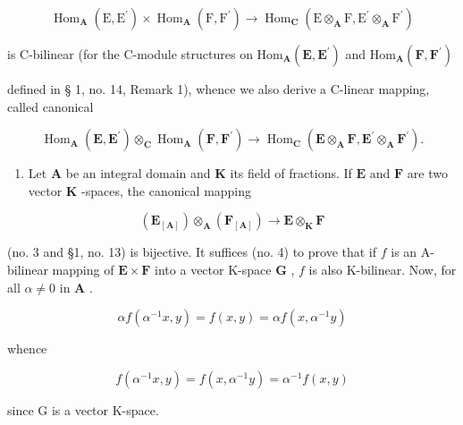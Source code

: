 \[
\operatorname{Hom} _ {\mathbf {A}} (\mathrm{E}, \mathrm{E} ^ {\prime}) \times \operatorname{Hom} _ {\mathbf {A}} (\mathrm{F}, \mathrm{F} ^ {\prime}) \rightarrow \operatorname{Hom} _ {\mathbf {C}} (\mathrm{E} \otimes_ {\mathbf {A}} \mathrm{F}, \mathrm{E} ^ {\prime} \otimes_ {\mathbf {A}} \mathrm{F} ^ {\prime})
\]

is C-bilinear (for the C-module structures on \(\mathrm{Hom}_{\mathbf{A}}(\mathbf{E},\mathbf{E}^{\prime})\) and \(\mathrm{Hom}_{\mathbf{A}}(\mathbf{F},\mathbf{F}^{\prime})\)

defined in § 1, no. 14, Remark 1), whence we also derive a C-linear mapping, called canonical

\[
\operatorname{Hom} _ {\mathbf {A}} (\mathbf {E}, \mathbf {E} ^ {\prime}) \otimes_ {\mathbf {C}} \operatorname{Hom} _ {\mathbf {A}} (\mathbf {F}, \mathbf {F} ^ {\prime}) \rightarrow \operatorname{Hom} _ {\mathbf {C}} (\mathbf {E} \otimes_ {\mathbf {A}} \mathbf {F}, \mathbf {E} ^ {\prime} \otimes_ {\mathbf {A}} \mathbf {F} ^ {\prime}).\tag{13}
\]

\begin{enumerate}
\def\labelenumi{(\arabic{enumi})}
\setcounter{enumi}{2}
\tightlist
\item
  Let \(\mathbf{A}\) be an integral domain and \(\mathbf{K}\) its field of fractions. If \(\mathbf{E}\) and \(\mathbf{F}\) are two vector \(\mathbf{K}\) -spaces, the canonical mapping
\end{enumerate}

\[
\left(\mathbf {E} _ {[ \mathbf {A} ]}\right) \otimes_ {\mathbf {A}} \left(\mathbf {F} _ {[ \mathbf {A} ]}\right)\rightarrow \mathbf {E} \otimes_ {\mathbf {K}} \mathbf {F}
\]

(no. 3 and §1, no. 13) is bijective. It suffices (no. 4) to prove that if \(f\) is an A-bilinear mapping of \(\mathbf{E} \times \mathbf{F}\) into a vector K-space \(\mathbf{G}\) , \(f\) is also K-bilinear. Now, for all \(\alpha \neq 0\) in \(\mathbf{A}\) .

\[
\alpha f (\alpha^ {- 1} x, y) = f (x, y) = \alpha f (x, \alpha^ {- 1} y)
\]

whence

\[
f (\alpha^ {- 1} x, y) = f (x, \alpha^ {- 1} y) = \alpha^ {- 1} f (x, y)
\]

since G is a vector K-space.


